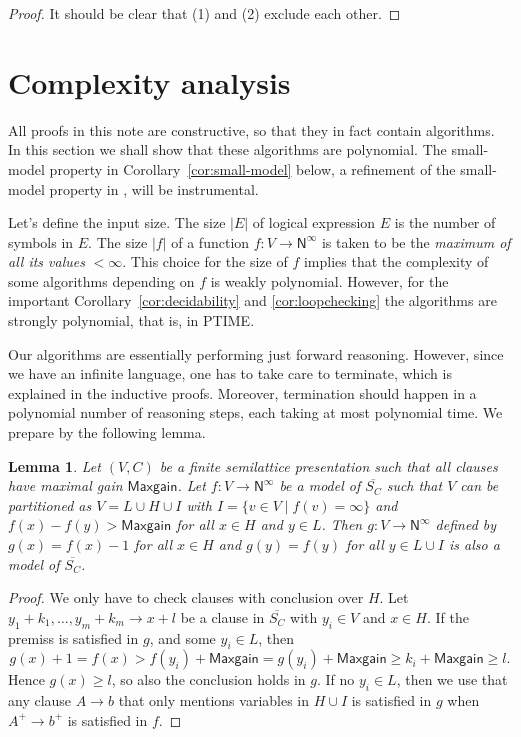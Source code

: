\documentclass[11pt,a4paper]{article}
\newtheorem{lemma}[theorem]{Lemma}
\newcommand{\N}{\mathsf{N}}
\newcommand\set[1]{\{#1\}}
\newcommand\jbody[3]{{{#1_1}+{#2_1}},\ldots,{{#1_#3}+{#2_#3}}}
\newcommand\Ninf{\N^\infty}
\newcommand\M{\mathsf{Maxgain}}
\newcommand\upS[1]{\overline{S_{#1}}}
\begin{document}
\begin{proof}
It should be clear that (1) and (2) exclude each other.
\end{proof}

\section{Complexity analysis}\label{sec:complexity}

All proofs in this note are constructive, so that they in fact
contain algorithms. In this section we shall show
that these algorithms are polynomial. 
The small-model property in Corollary~\ref{cor:small-model} below, 
a refinement of the small-model property in \cite{BNR},
will be instrumental.

Let's define the input size. The size $|E|$ of logical expression $E$ is
the number of symbols in $E$. The size $|f|$ of a function $f: V\to\Ninf$
is taken to be the \emph{maximum of all its values} $<\infty$. %
This choice for the size of $f$ implies that the complexity of some
algorithms depending on $f$ is weakly polynomial. 
However, for the important
Corollary~\ref{cor:decidability} and \ref{cor:loopchecking}
the algorithms are strongly polynomial, that is, in PTIME.

Our algorithms are essentially performing just forward reasoning. 
However, since we have an infinite language, one has to take care
to terminate, which is explained in the inductive proofs. 
Moreover, termination should happen in a polynomial number of reasoning
steps, each taking at most polynomial time. We prepare 
by the following lemma.


\begin{lemma}\label{thm:compress-model}
Let  $(V,C)$ be a finite semilattice presentation such that all
clauses have maximal gain $\M$.
Let $f: V\to\Ninf$ be a model of $\upS{C}$ such that $V$ can be
partitioned as $V = L\cup H\cup I$ with $I= \set{v\in V \mid f(v)=\infty}$
and $f(x)-f(y) > \M$ for all $x\in H$ and $y\in L$.
Then $g: V\to\Ninf$ defined by $g(x)=f(x)-1$ for all $x \in H$ and $g(y)=f(y)$
for all $y\in L\cup I$ is also a model of $\upS{C}$.
\end{lemma}
\begin{proof}
We only have to check clauses with conclusion over $H$.
Let $\jbody{y}{k}{m} \to x+l$ be a clause in $\upS{C}$ with $y_i \in V$
and $x\in H$. If the premiss is satisfied in $g$, and some $y_i\in L$, then
\[
g(x)+1 = f(x) > f(y_i)+\M = g(y_i)+\M \geqslant k_i+\M \geqslant l.
\]
Hence $g(x)\geqslant l$, so also the conclusion holds in $g$.
If no $y_i\in L$, then we use that any clause $A\to b$ 
that only mentions variables in $H\cup I$
is satisfied in $g$ when $A^+ \to b^+$ is satisfied in $f$. 
\end{proof}
\end{document}
